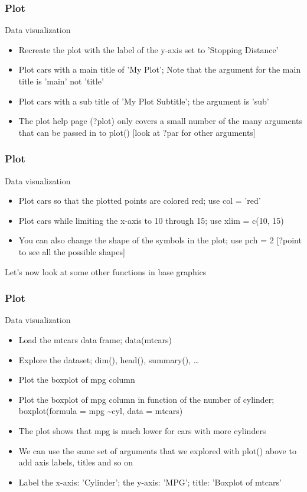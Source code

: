 \documentclass{beamer}
\begin{document}
\begin{frame}[fragile]
	\frametitle{Plot}
	\centering \Large Data visualization
	\begin{itemize}
		\small
		\item Recreate the plot with the label of the y-axis set to 'Stopping Distance' 
	\pause
		\item Plot cars with a main title of 'My Plot'; Note that the argument for the main title is 'main' not 'title'
	\pause
		\item Plot cars with a sub title of 'My Plot Subtitle'; the argument is 'sub'
	\pause
		\item The plot help page (?plot) only covers a small number of the many arguments that can be passed in to plot() [look at ?par for other arguments]
	\end{itemize}
\end{frame}

\begin{frame}[fragile]
	\frametitle{Plot}
	\centering \Large Data visualization
	\begin{itemize}
		\small
		\item Plot cars so that the plotted points are colored red; use col = 'red'
	\pause 
		\item Plot cars while limiting the x-axis to 10 through 15; use xlim = c(10, 15)
	\pause
		\item You can also change the shape of the symbols in the plot; use pch = 2 \tiny [?point to see all the possible shapes]
	\end{itemize}

	\vspace{20pt}

	\begin{center} Let's now look at some other functions in base graphics \end{center}
\end{frame}


\begin{frame}[fragile]
	\frametitle{Plot}
	\centering \Large Data visualization
	\begin{itemize}
		\small
		\item Load the mtcars data frame; data(mtcars)
	\pause 
		\item Explore the dataset; dim(), head(), summary(), \ldots
	\pause
		\item Plot the boxplot of mpg column
	\pause
		\item Plot the boxplot of mpg column in function of the number of cylinder; boxplot(formula = mpg \textasciitilde cyl, data = mtcars)
	\pause
		\item The plot shows that mpg is much lower for cars with more cylinders
		\item We can use the same set of arguments that we explored with plot() above to add axis labels, titles and so on
		\item Label the x-axis: 'Cylinder'; the y-axis: 'MPG'; title: 'Boxplot of mtcars'
	\end{itemize}
\end{frame}
\end{document}
